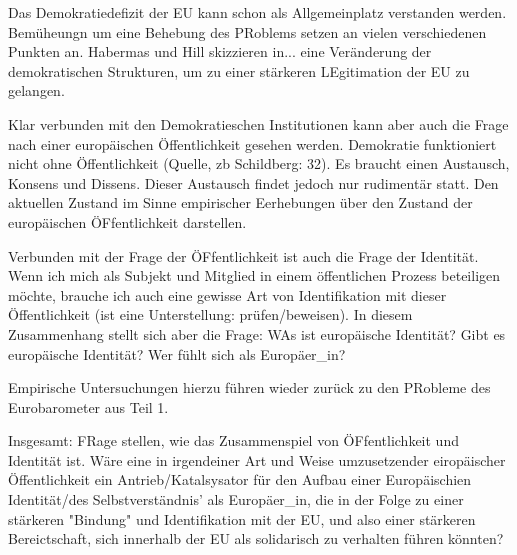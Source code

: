Das Demokratiedefizit der EU kann schon als Allgemeinplatz verstanden werden. Bemüheungn um eine Behebung des PRoblems setzen an vielen verschiedenen Punkten an. Habermas und Hill skizzieren in... eine Veränderung der demokratischen Strukturen, um zu einer stärkeren LEgitimation der EU zu gelangen.

Klar verbunden mit den Demokratieschen Institutionen kann aber auch die Frage nach einer europäischen Öffentlichkeit gesehen werden. Demokratie funktioniert nicht ohne Öffentlichkeit (Quelle, zb Schildberg: 32). Es braucht einen Austausch, Konsens und Dissens. Dieser Austausch findet jedoch nur rudimentär statt. Den aktuellen Zustand im Sinne empirischer Eerhebungen über den Zustand der europäischen ÖFfentlichkeit darstellen.

Verbunden mit der Frage der ÖFfentlichkeit ist auch die Frage der Identität. Wenn ich mich als Subjekt und Mitglied in einem öffentlichen Prozess beteiligen möchte, brauche ich auch eine gewisse Art von Identifikation mit dieser Öffentlichkeit (ist eine Unterstellung: prüfen/beweisen). In diesem Zusammenhang stellt sich aber die Frage: WAs ist europäische Identität? Gibt es europäische Identität? Wer fühlt sich als Europäer_in?

Empirische Untersuchungen hierzu führen wieder zurück zu den PRobleme des Eurobarometer aus Teil 1.

Insgesamt: FRage stellen, wie das Zusammenspiel von ÖFfentlichkeit und Identität ist. Wäre eine in irgendeiner Art und Weise umzusetzender eiropäischer Öffentlichkeit ein Antrieb/Katalsysator für den Aufbau einer Europäischien Identität/des Selbstverständnis' als Europäer_in, die in der Folge zu einer stärkeren "Bindung" und Identifikation mit der EU, und also einer stärkeren Bereictschaft, sich innerhalb der EU als solidarisch zu verhalten führen könnten?